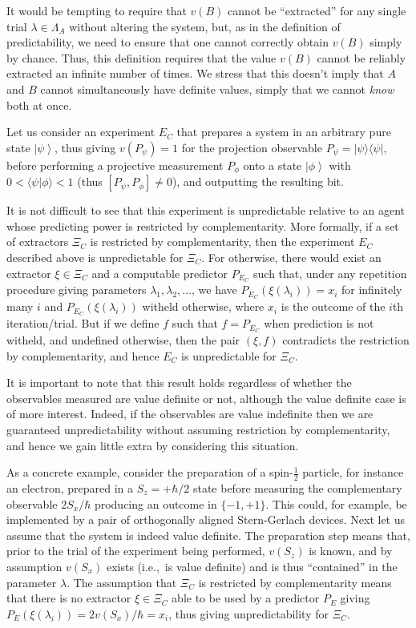 \documentclass[information,article,submit,moreauthors,pdftex,12pt,a4paper]{mdpi}
\theoremstyle{mdpi}
\newcounter{ex}
\newcounter{re}
\theoremstyle{mdpidefinition}
\newcommand{\ket}[1]{\left| #1 \right>}
\newcommand{\iprod}[2]{\langle #1 | #2 \rangle}
\newcommand{\oprod}[2]{| #1 \rangle\langle #2 |}
\begin{document}
It would be tempting to require that $v(B)$ cannot be ``extracted'' for any single trial $\lambda\in\Lambda_A$ without altering the system, but, as in the definition of predictability, we need to ensure that one cannot correctly obtain $v(B)$ simply by chance.
Thus, this definition requires that the value $v(B)$ cannot be reliably extracted an infinite number of times.
We stress that this doesn't imply that $A$ and $B$ cannot simultaneously have definite values, simply that we cannot \emph{know} both at once.



Let us consider an experiment $E_C$ that prepares a system in an arbitrary pure state $\ket{\psi}$, thus giving $v(P_\psi)=1$ for the projection observable $P_\psi=\oprod{\psi}{\psi}$, before performing a projective measurement $P_\phi$ onto a state $\ket{\phi}$ with $0 < \iprod{\psi}{\phi} < 1$ (thus $[P_\psi,P_\phi]\neq 0$), and outputting the resulting bit.


It is not difficult to see that  this experiment is unpredictable relative to an agent whose predicting power is restricted by complementarity.
More formally, if a set of extractors $\Xi_C$ is restricted by complementarity, then the experiment $E_C$ described above is unpredictable for $\Xi_C$.
For otherwise, there would exist an extractor $\xi\in\Xi_C$ and a computable predictor $P_{E_C}$ such that, under any repetition procedure giving parameters $\lambda_1,\lambda_2,\dots$, we have $P_{E_C}(\xi(\lambda_i))=x_i$ for infinitely many $i$ and $P_{E_C}(\xi(\lambda_i))$ witheld otherwise, where $x_i$ is the outcome of the $i$th iteration/trial.
But if we define $f$ such that $f=P_{E_C}$ when prediction is not witheld, and undefined otherwise, then the pair $(\xi,f)$ contradicts the restriction by complementarity, and hence $E_C$ is unpredictable for $\Xi_C$.

It is important to note that this result holds regardless of whether the observables measured are value definite or not, although the value definite case is of more interest.
Indeed, if the observables are value indefinite then we are guaranteed unpredictability without assuming restriction by complementarity, and hence we gain little extra by considering this situation.


As a concrete example, consider the preparation of a spin-$\frac{1}{2}$ particle, for instance an electron, prepared in a $S_z=+\hbar/2$ state before measuring the complementary observable $2S_x/\hbar$ producing an outcome in $\{-1,+1\}.$
This could, for example, be implemented by a pair of orthogonally aligned Stern-Gerlach devices.
Next let us assume that the system is indeed value definite.
The preparation step means that, prior to the trial of the experiment being performed, $v(S_z)$ is known, and by assumption $v(S_x)$ exists (i.e.,\ is value definite) and is thus ``contained'' in the parameter $\lambda$.
The assumption that $\Xi_C$ is restricted by complementarity means that there is no extractor $\xi\in\Xi_C$ able  to be used by a predictor $P_E$ giving $P_E(\xi(\lambda_i))=2v(S_x)/\hbar=x_i$, thus giving unpredictability for $\Xi_C$.
\end{document}
